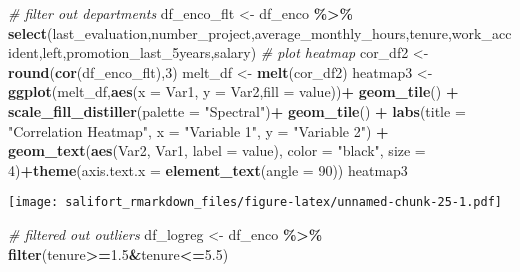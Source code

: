 \documentclass[
]{article}
\newenvironment{Shaded}{\begin{snugshade}}{\end{snugshade}}
\newcommand{\AttributeTok}[1]{\textcolor[rgb]{0.13,0.29,0.53}{#1}}
\newcommand{\CommentTok}[1]{\textcolor[rgb]{0.56,0.35,0.01}{\textit{#1}}}
\newcommand{\DecValTok}[1]{\textcolor[rgb]{0.00,0.00,0.81}{#1}}
\newcommand{\FloatTok}[1]{\textcolor[rgb]{0.00,0.00,0.81}{#1}}
\newcommand{\FunctionTok}[1]{\textcolor[rgb]{0.13,0.29,0.53}{\textbf{#1}}}
\newcommand{\NormalTok}[1]{#1}
\newcommand{\OtherTok}[1]{\textcolor[rgb]{0.56,0.35,0.01}{#1}}
\newcommand{\SpecialCharTok}[1]{\textcolor[rgb]{0.81,0.36,0.00}{\textbf{#1}}}
\newcommand{\StringTok}[1]{\textcolor[rgb]{0.31,0.60,0.02}{#1}}
\begin{document}
\begin{Shaded}
\begin{Highlighting}[]
\CommentTok{\# filter out departments}
\NormalTok{df\_enco\_flt }\OtherTok{\textless{}{-}}\NormalTok{ df\_enco }\SpecialCharTok{\%\textgreater{}\%} \FunctionTok{select}\NormalTok{(last\_evaluation,number\_project,average\_monthly\_hours,tenure,work\_accident,left,promotion\_last\_5years,salary)}
\CommentTok{\# plot heatmap}
\NormalTok{cor\_df2 }\OtherTok{\textless{}{-}} \FunctionTok{round}\NormalTok{(}\FunctionTok{cor}\NormalTok{(df\_enco\_flt),}\DecValTok{3}\NormalTok{)}
\NormalTok{melt\_df }\OtherTok{\textless{}{-}} \FunctionTok{melt}\NormalTok{(cor\_df2)}
\NormalTok{heatmap3 }\OtherTok{\textless{}{-}} \FunctionTok{ggplot}\NormalTok{(melt\_df,}\FunctionTok{aes}\NormalTok{(}\AttributeTok{x =}\NormalTok{ Var1, }\AttributeTok{y =}\NormalTok{ Var2,}\AttributeTok{fill =}\NormalTok{ value))}\SpecialCharTok{+}
  \FunctionTok{geom\_tile}\NormalTok{() }\SpecialCharTok{+} \FunctionTok{scale\_fill\_distiller}\NormalTok{(}\AttributeTok{palette =} \StringTok{"Spectral"}\NormalTok{)}\SpecialCharTok{+}
  \FunctionTok{geom\_tile}\NormalTok{() }\SpecialCharTok{+}
  \FunctionTok{labs}\NormalTok{(}\AttributeTok{title =} \StringTok{"Correlation Heatmap"}\NormalTok{,}
       \AttributeTok{x =} \StringTok{"Variable 1"}\NormalTok{,}
       \AttributeTok{y =} \StringTok{"Variable 2"}\NormalTok{) }\SpecialCharTok{+} \FunctionTok{geom\_text}\NormalTok{(}\FunctionTok{aes}\NormalTok{(Var2, Var1, }\AttributeTok{label =}\NormalTok{ value), }
                                     \AttributeTok{color =} \StringTok{"black"}\NormalTok{, }\AttributeTok{size =} \DecValTok{4}\NormalTok{)}\SpecialCharTok{+}\FunctionTok{theme}\NormalTok{(}\AttributeTok{axis.text.x =} \FunctionTok{element\_text}\NormalTok{(}\AttributeTok{angle =} \DecValTok{90}\NormalTok{))}
\NormalTok{heatmap3}
\end{Highlighting}
\end{Shaded}

\texttt{[image: salifort\_rmarkdown\_files/figure-latex/unnamed-chunk-25-1.pdf]}

\begin{Shaded}
\begin{Highlighting}[]
\CommentTok{\# filtered out outliers}
\NormalTok{df\_logreg }\OtherTok{\textless{}{-}}\NormalTok{ df\_enco }\SpecialCharTok{\%\textgreater{}\%} \FunctionTok{filter}\NormalTok{(tenure}\SpecialCharTok{\textgreater{}=}\FloatTok{1.5}\SpecialCharTok{\&}\NormalTok{tenure}\SpecialCharTok{\textless{}=}\FloatTok{5.5}\NormalTok{)}
\end{Highlighting}
\end{Shaded}
\end{document}
